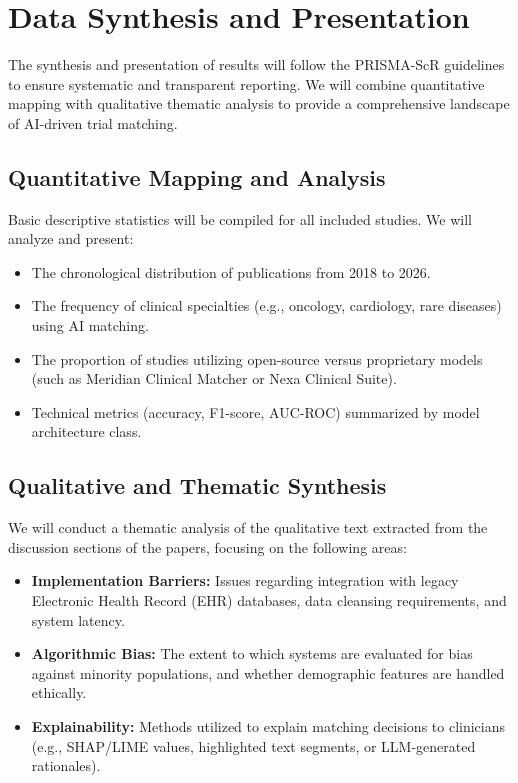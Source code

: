 \section{Data Synthesis and Presentation}

The synthesis and presentation of results will follow the PRISMA-ScR guidelines to ensure systematic and transparent reporting. We will combine quantitative mapping with qualitative thematic analysis to provide a comprehensive landscape of AI-driven trial matching.

\subsection{Quantitative Mapping and Analysis}
Basic descriptive statistics will be compiled for all included studies. We will analyze and present:
\begin{itemize}
  \item The chronological distribution of publications from 2018 to 2026.
  \item The frequency of clinical specialties (e.g., oncology, cardiology, rare diseases) using AI matching.
  \item The proportion of studies utilizing open-source versus proprietary models (such as Meridian Clinical Matcher or Nexa Clinical Suite).
  \item Technical metrics (accuracy, F1-score, AUC-ROC) summarized by model architecture class.
\end{itemize}

\subsection{Qualitative and Thematic Synthesis}
We will conduct a thematic analysis of the qualitative text extracted from the discussion sections of the papers, focusing on the following areas:
\begin{itemize}
  \item \textbf{Implementation Barriers:} Issues regarding integration with legacy Electronic Health Record (EHR) databases, data cleansing requirements, and system latency.
  \item \textbf{Algorithmic Bias:} The extent to which systems are evaluated for bias against minority populations, and whether demographic features are handled ethically.
  \item \textbf{Explainability:} Methods utilized to explain matching decisions to clinicians (e.g., SHAP/LIME values, highlighted text segments, or LLM-generated rationales).
\end{itemize}

